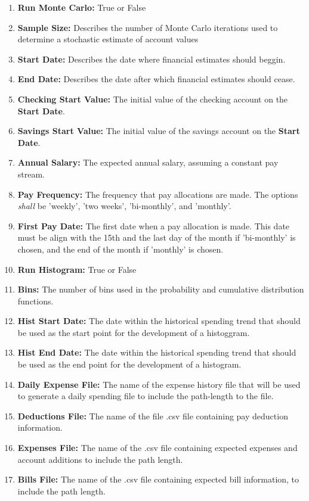 \begin{enumerate}
\item {\textbf{Run Monte Carlo:}} True or False
\item {\textbf{Sample Size:}} Describes the number of Monte Carlo iterations 
used to determine a stochastic estimate of account values
\item {\textbf{Start Date:}} Describes the date where financial estimates should
beggin.
\item {\textbf{End Date:}} Describes the date after which financial estimates should
cease.
\item {\textbf{Checking Start Value:}}  The initial value of the checking account on
the {\textbf{Start Date}}.
\item {\textbf{Savings Start Value:}} The initial value of the savings account on
the {\textbf{Start Date}}.
\item {\textbf{Annual Salary:}} The expected annual salary, assuming a constant
pay stream.
\item{\textbf{Pay Frequency:}} The frequency that pay allocations are made.  The 
options {\textit{shall}} be 'weekly', 'two weeks', 'bi-monthly', and 'monthly'.
\item {\textbf{First Pay Date:}} The first date when a pay allocation is made.  This
date must be align with the 15th and the last day of the month  if 'bi-monthly' is
chosen, and the end of the month if 'monthly' is chosen.
\item {\textbf{Run Histogram:}} True or False
\item {\textbf{Bins:}} The number of bins used in the probability and cumulative
	               distribution functions.
\item {\textbf{Hist Start Date:}} The date within the historical spending trend 
that should be used as the start point for the development of a histoggram.
\item {\textbf{Hist End Date:}} The date within the historical spending trend
that should be used as the end point for the development of a histogram.
\item {\textbf{Daily Expense File:}} The name of the expense history file that will be 
used to generate a daily spending file to include the path-length to the file.
\item {\textbf{Deductions File:}} The name of the file .csv file containing pay
deduction information.
\item {\textbf{Expenses File:}} The name of the .csv file containing expected
expenses and account additions to include the path length.
\item {\textbf{Bills File:}} The name of the .csv file containing expected bill
information, to include the path length.
\end{enumerate}

